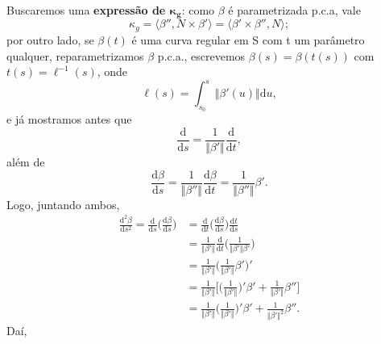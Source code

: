 \documentclass[../differential_geometry.tex]{subfiles}
\begin{document}
Buscaremos uma \textbf{expressão de \(\mathbf{\kappa_{g}}\)}: como \(\beta \) é parametrizada p.c.a, vale
\[
	\kappa_{g} = \langle \beta'', N\times \beta' \rangle = \langle \beta '\times \beta'', N \rangle;
\]
por outro lado, se \(\beta (t)\) é uma curva regular em S com t um parâmetro qualquer, reparametrizamos \(\beta \) p.c.a., escrevemos \(\beta (s) = \beta (t(s))\) com \(t(s)=\ell^{-1}(s)\), onde
\[
	\ell (s) = \int_{s_{0}}^{s}\Vert \beta'(u) \Vert \mathrm{d}u,
\]
e já mostramos antes que
\[
	\frac{\mathrm{d}}{\mathrm{d}s}=\frac{1}{\Vert \beta ' \Vert}\frac{\mathrm{d}}{\mathrm{d}t},
\]
além de
\[
	\frac{\mathrm{d}\beta }{\mathrm{d}s}=\frac{1}{\Vert \beta '' \Vert}\frac{\mathrm{d}\beta }{\mathrm{d}t} = \frac{1}{\Vert \beta '' \Vert}\beta '.
\]
Logo, juntando ambos,
\begin{align*}
	\frac{\mathrm{d}^{2}\beta }{\mathrm{d}s^{2}} = \frac{\mathrm{d}}{\mathrm{d}s}\biggl(\frac{\mathrm{d}\beta }{\mathrm{d}s}\biggr) & = \frac{\mathrm{d}}{\mathrm{d}t}\biggl(\frac{\mathrm{d}\beta }{\mathrm{d}s}\biggr)\frac{\mathrm{d}t}{\mathrm{d}s}                       \\
	                                                                                                                                & = \frac{1}{\Vert \beta '\Vert}\frac{\mathrm{d}}{\mathrm{d}t}\biggl(\frac{1}{\Vert \beta ' \Vert \beta '}\biggr)                         \\
	                                                                                                                                & = \frac{1}{\Vert \beta ' \Vert}\biggl(\frac{1}{\Vert \beta ' \Vert}\beta '\biggr)'                                                      \\
	                                                                                                                                & = \frac{1}{\Vert \beta ' \Vert}\biggl[\biggl(\frac{1}{\Vert \beta ' \Vert}\biggr)'\beta' + \frac{1}{\Vert \beta ' \Vert}\beta ''\biggr] \\
	                                                                                                                                & = \frac{1}{\Vert \beta ' \Vert}\biggl(\frac{1}{\Vert \beta ' \Vert}\biggr)'\beta' + \frac{1}{\Vert \beta ' \Vert^{2}}\beta''.
\end{align*}
Daí,
\end{document}
